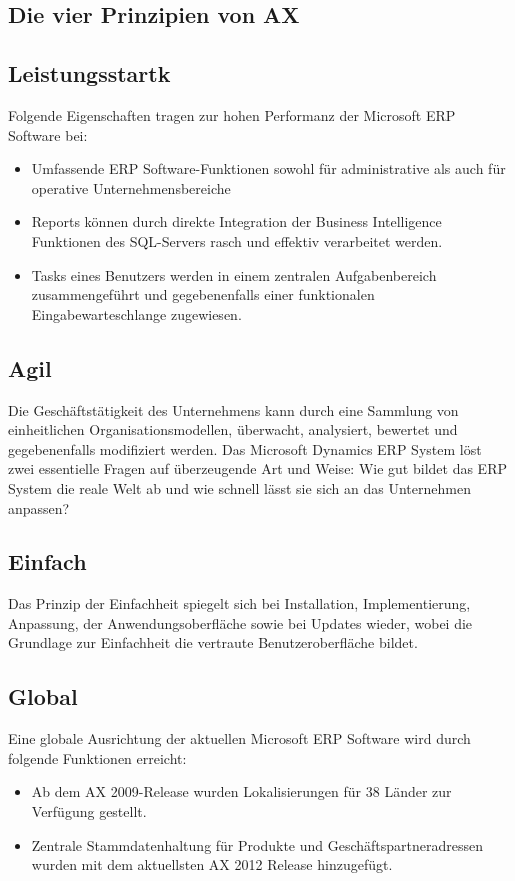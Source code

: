 \begin{sloppypar}
\subsection{Die vier Prinzipien von AX}

\subsection{Leistungsstartk}

Folgende Eigenschaften tragen zur hohen Performanz der Microsoft ERP Software bei:
\begin{itemize}
\item Umfassende ERP Software-Funktionen sowohl für administrative als auch für operative Unternehmensbereiche
\item Reports können durch direkte Integration der Business Intelligence Funktionen des SQL-Servers rasch und effektiv verarbeitet werden.
\item Tasks eines Benutzers werden in einem zentralen Aufgabenbereich zusammengeführt und gegebenenfalls einer funktionalen Eingabewarteschlange zugewiesen.
\end{itemize}

\subsection{Agil}

Die Geschäftstätigkeit des Unternehmens kann durch eine Sammlung von einheitlichen Organisationsmodellen, überwacht, analysiert, bewertet und gegebenenfalls modifiziert werden.
Das Microsoft Dynamics ERP System löst zwei essentielle Fragen auf überzeugende Art und Weise: 
Wie gut bildet das ERP System die reale Welt ab und wie schnell lässt sie sich an das Unternehmen anpassen?

\subsection{Einfach}

Das Prinzip der Einfachheit spiegelt sich bei Installation, Implementierung, Anpassung, der Anwendungsoberfläche sowie bei Updates wieder, wobei die Grundlage zur Einfachheit die vertraute Benutzeroberfläche bildet.

\subsection{Global}

Eine globale Ausrichtung der aktuellen Microsoft ERP Software wird durch folgende Funktionen erreicht:

\begin{itemize}
\item Ab dem AX 2009-Release wurden Lokalisierungen für 38 Länder zur Verfügung gestellt.
\item Zentrale Stammdatenhaltung für Produkte und Geschäftspartneradressen wurden mit dem aktuellsten AX 2012 Release hinzugefügt.
\end{itemize}





\end{sloppypar}
